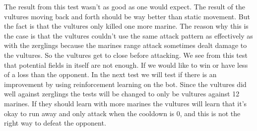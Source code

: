 The result from this test wasn't as good as one would expect. The result of the vultures moving back and forth should be way better than static movement. But the fact is that the vultures only killed one more marine. The reason why this is the case is that the vultures couldn't use the same attack pattern as effectively as with the zerglings because the marines range attack sometimes dealt damage to the vultures. So the vultures get to close before attacking.
We see from this test that potential fields in itself are not enough. If we would like to win or have less of a loss than the opponent. In the next test we will test if there is an improvement by using reinforcement learning on the bot. Since the vultures did well against zerglings the tests will be changed to only be vultures against 12 marines. If they should learn with more marines the vultures will learn that it's okay to run away and only attack when the cooldown is 0, and this is not the right way to defeat the opponent.




